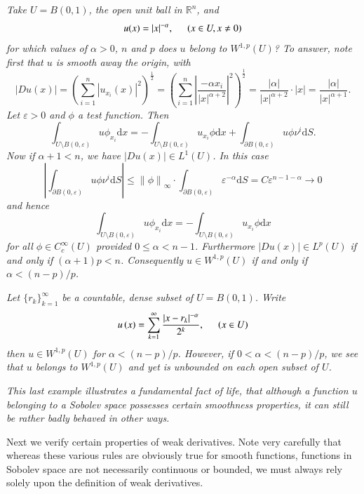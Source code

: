 \begin{example}\em
Take $U=B(0,1)$, the open unit ball in $\mathbb{R}^n$, and 
$$u(x)=|x|^{-\alpha},\hspace{0.5cm}(x\in U,x\ne 0)$$
for which values of $\alpha>0$, $n$ and $p$ does $u$ belong to $W^{1,p}(U)$? To answer, note first that $u$ is smooth away the origin, with 
$$
\left| Du\left( x \right) \right|=\left( \sum_{i=1}^n{\left| u_{x_i}\left( x \right) \right|^2} \right) ^{\frac{1}{2}}=\left( \sum_{i=1}^n{\left| \frac{-\alpha x_i}{\left| x \right|^{\alpha +2}} \right|^2} \right) ^{\frac{1}{2}}=\frac{\left| \alpha \right|}{\left| x \right|^{\alpha +2}}\cdot \left| x \right|=\frac{\left| \alpha \right|}{\left| x \right|^{\alpha +1}}.
$$
Let $\varepsilon>0$ and $\phi$ a test function. Then 
$$
\int_{U\setminus B\left( 0,\varepsilon \right)}{u\phi _{x_i}\mathrm{d}x}=-\int_{U\setminus B\left( 0,\varepsilon \right)}{u_{x_i}\phi \mathrm{d}x}+\int_{\partial B\left( 0,\varepsilon \right)}{u\phi \nu ^i\mathrm{d}S}.
$$
Now if $\alpha+1<n$, we have $|Du(x)|\in L^1(U)$. In this case 
$$
\left| \int_{\partial B\left( 0,\varepsilon \right)}{u\phi \nu ^i\mathrm{d}S} \right|\le \left\| \phi \right\| _{\infty}\cdot \int_{\partial B\left( 0,\varepsilon \right)}{\varepsilon ^{-\alpha}\mathrm{d}S}=C\varepsilon ^{n-1-\alpha}\rightarrow 0
$$
and hence 
$$
\int_{U\setminus B\left( 0,\varepsilon \right)}{u\phi _{x_i}\mathrm{d}x}=-\int_{U\setminus B\left( 0,\varepsilon \right)}{u_{x_i}\phi \mathrm{d}x}
$$
for all $\phi\in C_c^\infty(U)$ provided $0\le\alpha<n-1$. Furthermore $|Du(x)|\in L^p(U)$ if and only if $(\alpha+1)p<n$. Consequently $u\in W^{1,p}(U)$ if and only if $\alpha<(n-p)/p$.
\end{example}
\begin{example}\em
Let $\{r_k\}_{k=1}^\infty$ be a countable, dense subset of $U=B(0,1)$. Write 
$$
u\left( x \right) =\sum_{k=1}^{\infty}{\frac{\left| x-r_k \right|^{-\alpha}}{2^k}},\hspace{0.5cm}\left( x\in U \right) 
$$
then $u\in W^{1,p}(U)$ for $\alpha<(n-p)/p$. However, if $0<\alpha<(n-p)/p$, we see that $u$ belongs to $W^{1,p}(U)$ and yet is unbounded on each open subset of $U$.
\end{example}
\begin{note}\em
This last example illustrates a fundamental fact of life, that although a function $u$ belonging to a Sobolev space possesses certain smoothness properties, it can still be rather badly behaved in other ways.
\end{note}
Next we verify certain properties of weak derivatives. Note very carefully that whereas these various rules are obviously true for smooth functions, functions in Sobolev space are not necessarily continuous or bounded, we must always rely solely upon the definition of weak derivatives.
